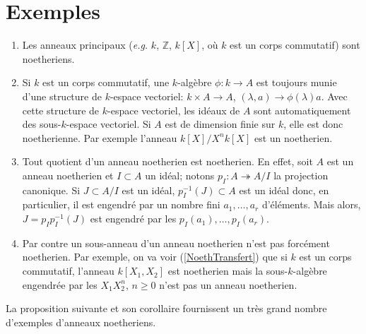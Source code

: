 \documentclass[a4paper, oneside, 12pt]{book}
\theoremstyle{definition} %
\newcommand{\Z}{\mathbb{Z}}
\begin{document}
    \section{Exemples}\label{NoethEx}
      \begin{enumerate}[leftmargin=* ,parsep=0cm,itemsep=0cm,topsep=0cm]
     \item  Les anneaux principaux (\textit{e.g.} $k$, $\Z$, $k[X]$, où $k$ est un corps commutatif) sont noetheriens. 
     \item  Si $k$ est un corps commutatif, une  $k$-algèbre $\phi:k\rightarrow A$ est toujours munie d'une structure de $k$-espace vectoriel: $k\times A\rightarrow A$, $(\lambda,a)\rightarrow \phi(\lambda)a$. Avec cette structure de $k$-espace vectoriel, les idéaux de $A$ sont automatiquement des sous-$k$-espace vectoriel. Si $A$ est de dimension finie sur $k$, elle est donc noetherienne. Par exemple l'anneau $k[X]/X^nk[X]$ est un  noetherien. 
     \item  Tout quotient d'un anneau noetherien est noetherien. En effet, soit $A$ est un anneau noetherien et $I\subset A$  un idéal; notons $p_I:A\twoheadrightarrow A/I$ la projection canonique. Si $J\subset A/I$ est un idéal, $p_I^{-1}(J)\subset A$ est un idéal donc, en particulier, il est engendré par un nombre fini $a_1,\dots, a_r$ d'éléments. Mais alors, $J=p_Ip_I^{-1}(J)$ est engendré par les  $p_I(a_1),\dots, p_I(a_r)$.
     \item Par contre un sous-anneau d'un anneau noetherien n'est pas forcément noetherien. Par exemple, on va voir (\ref{NoethTransfert}) que si $k$ est un corps commutatif, l'anneau $k[X_1,X_2]$ est noetherien mais la sous-$k$-algèbre engendrée par les $  X_1X_2^n$, $n\geq 0$ n'est pas un anneau noetherien.\\
\end{enumerate}
    
 La proposition suivante et son corollaire fournissent un très grand nombre d'exemples d'anneaux noetheriens.   
    
\end{document}
